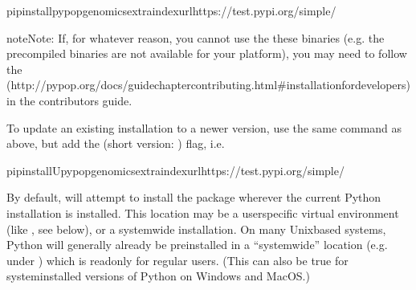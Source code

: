 \documentclass[letterpaper,10pt,english,openany,oneside]{sphinxmanual}
\begin{document}
\begin{sphinxVerbatim}[commandchars=\\\{\}]
pipinstallpypop\PYGZhy{}genomics\PYGZhy{}\PYGZhy{}extra\PYGZhy{}index\PYGZhy{}urlhttps://test.pypi.org/simple/
\end{sphinxVerbatim}

\begin{sphinxadmonition}{note}{Note:}
\sphinxAtStartPar
If, for whatever reason, you cannot use the these binaries
(e.g. the pre\sphinxhyphen{}compiled binaries are not available for your
platform), you may need to follow the  (http://pypop.org/docs/guide\sphinxhyphen{}chapter\sphinxhyphen{}contributing.html\#installation\sphinxhyphen{}for\sphinxhyphen{}developers) in the contributors
guide.
\end{sphinxadmonition}

\sphinxAtStartPar
{}

\sphinxAtStartPar
To update an existing installation to a newer version, use the same
command as above, but add the  (short version: )
flag, i.e.

\begin{sphinxVerbatim}[commandchars=\\\{\}]
pipinstall\PYGZhy{}Upypop\PYGZhy{}genomics\PYGZhy{}\PYGZhy{}extra\PYGZhy{}index\PYGZhy{}urlhttps://test.pypi.org/simple/
\end{sphinxVerbatim}

\sphinxAtStartPar
{}

\sphinxAtStartPar
By default,  will attempt to install the 
package wherever the current Python installation is installed.  This
location may be a user\sphinxhyphen{}specific virtual environment (like ,
see below), or a system\sphinxhyphen{}wide installation. On many Unix\sphinxhyphen{}based systems,
Python will generally already be pre\sphinxhyphen{}installed in a “system\sphinxhyphen{}wide”
location (e.g. under ) which is read\sphinxhyphen{}only for regular
users. (This can also be true for system\sphinxhyphen{}installed versions of Python
on Windows and MacOS.)
\end{document}
